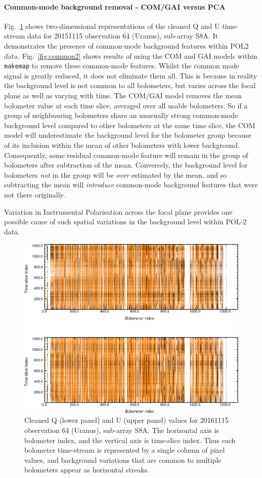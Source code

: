 \documentclass[twoside,11pt]{starlink}
\begin{document}
\paragraph{Common-mode background removal - COM/GAI versus PCA}
Fig.~\ref{fig:common} shows two-dimensional representations of the
cleaned Q and U time-stream data for 20151115 observation 64 (Uranus),
sub-array S8A. It demonstrates the presence of common-mode background
features within POL2 data. Fig.~\ref{fig:common2} shows results of using
the COM and GAI models within \texttt{makemap} to remove these
common-mode features. Whilst the common mode signal is greatly reduced,
it does not eliminate them all. This is because in reality the background
level is not common to all bolometers, but varies across the focal plane
as well as varying with time. The COM/GAI model removes the mean
bolometer value at each time slice, averaged over all usable bolometers.
So if a group of neighbouring bolometers share an unusually strong
common-mode background level compared to other bolometers at the same time
slice, the COM model will underestimate the background level for the
bolometer group because of its inclusion within the mean of other
bolometers with lower background. Consequently, some residual common-mode
feature will remain in the group of bolometers after subtraction of the mean.
Conversely, the background level for bolometers \emph{not} in the group
will be \emph{over} estimated by the mean, and so subtracting the mean
will \emph{introduce} common-mode background features that were not there
originally.

Variation in Instrumental Polarisation across the focal plane provides one
possible cause of such spatial variations in the background level within
POL-2 data.

\begin{figure}
\includegraphics[width=\columnwidth]{common}
\caption{Cleaned Q (lower panel) and U (upper panel) values for 20161115
observation 64 (Uranus), sub-array S8A. The horizontal axis is bolometer
index, and the vertical axis is time-slice index. Thus each bolometer
time-stream is represented by a single column of pixel values, and
background variations that are common to multiple bolometers appear as
horizontal streaks.}
\label{fig:common}
\end{figure}
\end{document}
